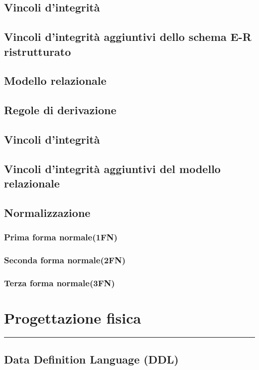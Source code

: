 \documentclass[legalpaper]{article}
\begin{document}
\subsection{Vincoli d'integrità}

\subsection{Vincoli d'integrità aggiuntivi dello schema E-R ristrutturato}

\subsection{Modello relazionale}


\subsection{Regole di derivazione}

\subsection{Vincoli d'integrità}

\subsection{Vincoli d'integrità aggiuntivi del modello relazionale}

\subsection{Normalizzazione}
\subsubsection{Prima forma normale(1FN)}
\subsubsection{Seconda forma normale(2FN)}
\subsubsection{Terza forma normale(3FN)}

\newpage
\section{Progettazione fisica}
\rule{\linewidth}{1.5pt}
\subsection{Data Definition Language (DDL)}
\end{document}
